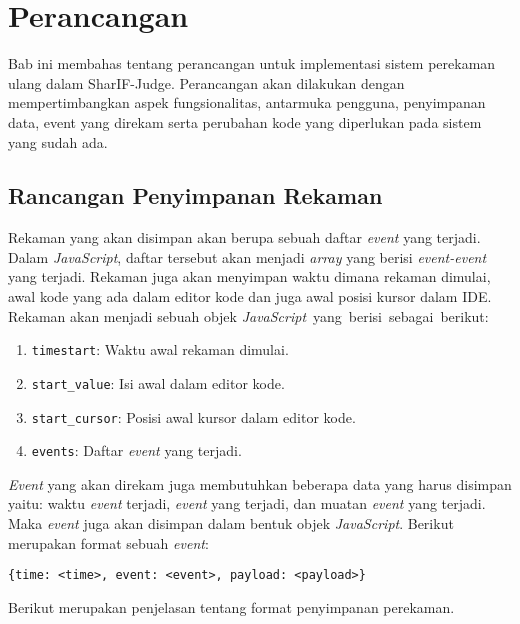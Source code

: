 \chapter{Perancangan}
\label{chap:perancangan}

Bab ini membahas tentang perancangan untuk implementasi sistem perekaman ulang dalam SharIF-Judge. Perancangan akan dilakukan dengan mempertimbangkan aspek fungsionalitas, antarmuka pengguna, penyimpanan data, event yang direkam serta perubahan kode yang diperlukan pada sistem yang sudah ada.

\section{Rancangan Penyimpanan Rekaman}
\label{sec:4:2:storerekaman}

Rekaman yang akan disimpan akan berupa sebuah daftar \textit{event} yang terjadi. Dalam \textit{JavaScript}, daftar tersebut akan menjadi \textit{array} yang berisi \textit{event-event} yang terjadi. Rekaman juga akan menyimpan waktu dimana rekaman dimulai, awal kode yang ada dalam editor kode dan juga awal posisi kursor dalam IDE. Rekaman akan menjadi sebuah objek \mbox{\textit{JavaScript} yang berisi sebagai berikut:}

\begin{enumerate}
    \item \verb|timestart|: Waktu awal rekaman dimulai.
    \item \verb|start_value|: Isi awal dalam editor kode.
    \item \verb|start_cursor|: Posisi awal kursor dalam editor kode.
    \item \verb|events|: Daftar \textit{event} yang terjadi.
\end{enumerate}

\textit{Event} yang akan direkam juga membutuhkan beberapa data yang harus disimpan yaitu: waktu \textit{event} terjadi, \textit{event} yang terjadi, dan muatan \textit{event} yang terjadi. Maka \textit{event} juga akan disimpan dalam bentuk objek \textit{JavaScript}. Berikut merupakan format sebuah \textit{event}:

\begin{center}
    \verb|{time: <time>, event: <event>, payload: <payload>}|
\end{center}

Berikut merupakan penjelasan tentang format penyimpanan perekaman.

